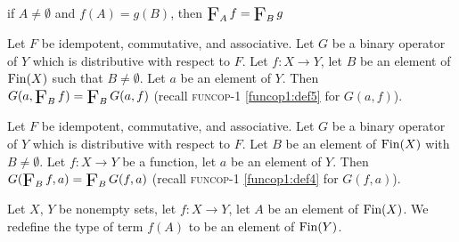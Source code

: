 \documentclass{article}
\begin{document}
\begin{thm}
  if $A\neq\emptyset$ and $f(A)=g(B)$,
  then $\iteratedBinop{F}_{A}f=\iteratedBinop{F}_{B}g$
\item\label{setwiseo:27} Let $F$ be idempotent, commutative, and associative.
  Let $G$ be a binary operator of $Y$ which is distributive with respect to $F$.
  Let $f\colon X\to Y$, let $B$ be an element of $\operatorname{Fin}(X)$ such that
  $B\neq\emptyset$. Let $a$ be an element of $Y$.
  Then $G(a,\iteratedBinop{F}_{B}f)=\iteratedBinop{F}_{B}G(a,f)$ (recall
  \textsc{funcop-1} \ref{funcop1:def5} for $G(a,f)$).
\item\label{setwiseo:28} Let $F$ be idempotent, commutative, and associative.
  Let $G$ be a binary operator of $Y$ which is distributive with respect to $F$.
  Let $B$ be an element of $\operatorname{Fin}(X)$ with $B\neq\emptyset$.
  Let $f\colon X\to Y$ be a function, let $a$ be an element of $Y$.
  Then $G(\iteratedBinop{F}_{B}f,a)=\iteratedBinop{F}_{B}G(f,a)$ (recall
  \textsc{funcop-1} \ref{funcop1:def4} for $G(f,a)$).
\end{thm}

\begin{definition}
Let $X$, $Y$ be nonempty sets, let $f\colon X\to Y$, let $A$ be an
element of $\operatorname{Fin}(X)$.
We redefine the type of term $f(A)$ to be an element of $\operatorname{Fin}(Y)$.
\end{definition}
\end{document}
